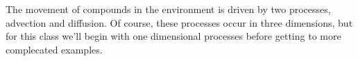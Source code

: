 \documentclass{article}
\begin{document}


\noindent The movement of compounds in the environment is driven by two processes, advection and diffusion. Of course, these processes occur in three dimensions, but for this class we'll begin with one dimensional processes before getting to more complecated examples.
\end{document}
